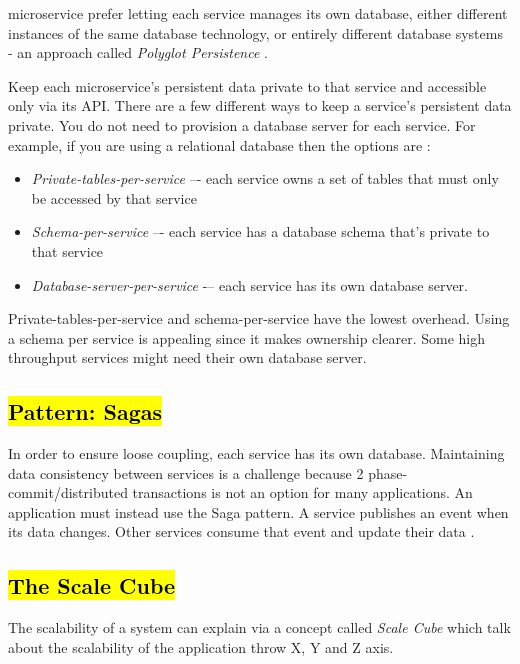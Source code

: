 \acrshort{microservice} prefer letting each service manages its own database, either different instances of the same database technology, or entirely different database systems - an approach called \emph{Polyglot Persistence} \cite{LewisMicroservicesManagement}.

Keep each microservice’s persistent data private to that service and accessible only via its API. 
There are a few different ways to keep a service’s persistent data private. You do not need to provision a database server for each service. For example, if you are using a relational database then the options are \cite{RichardsonMicroservicesService}:
\begin{itemize}
    \item \emph{Private-tables-per-service} –- each service owns a set of tables that must only be accessed by that service
    \item \emph{Schema-per-service} –- each service has a database schema that’s private to that service
    \item \emph{Database-server-per-service} -– each service has its own database server.
\end{itemize}
Private-tables-per-service and schema-per-service have the lowest overhead. Using a schema per service is appealing since it makes ownership clearer. Some high throughput services might need their own database server.

\subsection{\hl{Pattern: Sagas}}
\label{subse:sagas}
In order to ensure loose coupling, each service has its own database. Maintaining data consistency between services is a challenge because 2 phase-commit/distributed transactions is not an option for many applications. An application must instead use the Saga pattern. A service publishes an event when its data changes. Other services consume that event and update their data \cite{RichardsonMicroservicesSagas}.

\subsection{\hl{The Scale Cube}}
\label{subse:scale_cube}
The scalability of a system can explain via a concept called \emph{Scale Cube} which talk about the scalability of the application throw X, Y and Z axis.

